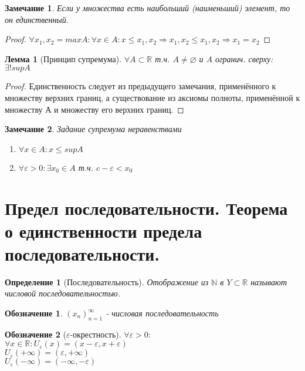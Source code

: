 \documentclass[11pt,a4paper,titlepage]{article}
\newtheorem*{definition}{Определение}
\newtheorem*{notation}{Обозначение}
\newtheorem*{remark}{Замечание}
\newtheorem*{lemma}{Лемма}
\renewcommand{\implies}{\Rightarrow}
\renewcommand{\emptyset}{\varnothing}
\renewcommand{\epsilon}{\varepsilon}
\newcommand{\R}{\mathbb{R}}
\newcommand{\N}{\mathbb{N}}
\begin{document}
    \begin{remark}
        Если у множества есть наибольший (наименьший) элемент, то он единственный.
    \end{remark}

    \begin{proof}
        $\forall x_1, x_2 = maxA: \forall x \in A: x \leq x_1, x_2 \implies x_1, x_2 \leq x_1, x_2 \implies x_1 = x_2$
    \end{proof}

    \begin{lemma}[Принцип супремума]
        $\forall A \subset \R$ т.ч. $A \neq \emptyset$ и A огранич. сверху: $\exists!supA$
    \end{lemma}

    \begin{proof}
        Единственность следует из предыдущего замечания, применённого к множеству верхних границ, а существование из аксиомы полноты, применённой к множеству А и множеству его верхних границ.
    \end{proof}

    \begin{remark}
        Задание супремума неравенствами
        \begin{enumerate}
            \item $\forall x \in A: x \leq supA$
            \item $\forall \epsilon > 0: \exists x_0 \in A$ т.ч. $c - \epsilon < x_0$
        \end{enumerate}
    \end{remark}


    \section{Предел последовательности. Теорема о единственности предела последовательности.}

    \begin{definition}[Последовательность]
        Отображение из $\N$ в $Y \subset \R$ называют числовой последовательностью.
    \end{definition}

    \begin{notation}
        $(x_n)_{n=1}^\infty$ - числовая последовательность
    \end{notation}

    \begin{notation}[$\epsilon$-окрестность]
        $\forall \epsilon > 0:$\\
        $\forall x \in \R: U_\epsilon(x) = (x-\epsilon, x+\epsilon)$\\
        $U_\epsilon(+\infty) = (\epsilon, +\infty)$\\
        $U_\epsilon(-\infty) = (-\infty, -\epsilon)$\\
    \end{notation}
\end{document}
